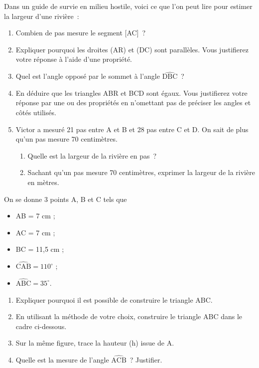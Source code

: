 \documentclass{article}
\begin{document}
\newpage\advance{}\vskip10pt\noindent
Dans un guide de survie en milieu hostile, voici ce que l'on peut lire pour
estimer la largeur d'une rivière~:
\begin{center}
\end{center}
\begin{enumerate}
    \item Combien de pas mesure le segment [AC]~?\dotedline\dotedline
    \item Expliquer pourquoi les droites (AR) et (DC) sont parallèles.
    Vous justifierez votre réponse à l'aide d'une propriété.\dotedline\dotedline\dotedline
    \item Quel est l'angle opposé par le sommet à l'angle $\widehat{\text{DBC}}$~?\dotedline
    \item En déduire que les triangles ABR et BCD sont égaux. Vous justifierez
    votre réponse par une ou des propriétés en n'omettant pas de préciser les
    angles et côtés utilisés.\dotedline\dotedline\dotedline
    \item Victor a mesuré 21 pas entre A et B et 28 pas entre C et D. On sait
    de plus qu'un pas mesure 70 centimètres.
    \begin{enumerate}[label=\alph*),font=\bfseries]
        \item Quelle est la largeur de la rivière en pas~?\dotedline\dotedline\dotedline
        \item Sachant qu'un pas mesure 70 centimètres, exprimer la largeur de
        la rivière en mètres.\dotedline\dotedline
    \end{enumerate}
\end{enumerate}

\newpage\advance{}\vskip10pt\noindent
On se donne 3 points A, B et C tels que
\begin{itemize}
    \item AB = 7 cm ;
    \item AC = 7 cm ;
    \item BC = 11,5 cm ;
    \item $\widehat{\text{CAB}}=110^\circ$ ;
    \item $\widehat{\text{ABC}}=35^\circ$.
\end{itemize}
\begin{enumerate}
    \item Expliquer pourquoi il est possible de construire le triangle ABC.
    \dotedline\dotedline
    \item En utilisant la méthode de votre choix, construire le triangle ABC
    dans le cadre ci-dessous.
    \begin{center}
    \end{center}
    \item Sur la même figure, trace la hauteur (h) issue de A.
    \item Quelle est la mesure de l'angle $\widehat{\text{ACB}}$~? Justifier.
    \dotedline\dotedline\dotedline
\end{enumerate}
\end{document}
